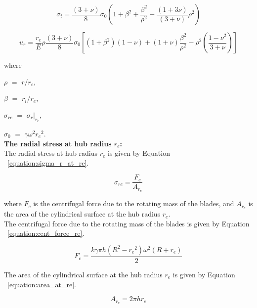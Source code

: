 \documentclass[12pt, a4paper, twoside]{article}
\begin{document}
\begin{equation}
	\label{equation:equation:r_sigma_t}
	{{\sigma }_{t}={\frac {(3+{\nu })} {8}{{\sigma }_{0}}}\left ( {1+{{\beta }^{2}}+{\frac {{\beta }^{2}} {{\rho }^{2}}-{\frac {\left ( {1+3{\nu }} \right )} {\left ( {3+{\nu }} \right )}}{\rho }^{2}}} \right )}
\end{equation}

\begin{equation}
	\label{equation:r_u_r}
	{{u}_{r}}={\frac {{r}_{e}} {E}}{{\rho }\frac {\left ( {3+{\nu }} \right )} {8}}{{\sigma }_{0}}\left [ {\left ( {1+{{\beta }^{2}}} \right )\left ( {1-{\nu }} \right )+\left ( {1+{\nu }} \right ){\frac {{\beta }^{2}} {{\rho }^{2}}}-{{\rho }^{2}}\left ( {{\frac {1-{{\nu }^{2}}} {3+{\nu }}}} \right )} \right ]
\end{equation}

where

$\rho$ $=$ $r/r_e$,

$\beta$ $=$ $r_i/r_e$,

$\sigma_{re}$ $=$ $\sigma_r|_{r_e}$, 

$\sigma_0$ $=$ $\gamma{\omega}^{2}{r_e}^{2}$.\\

\noindent
\textbf{The radial stress at hub radius $r_e$:}\\

The radial stress at hub radius $r_e$ is given by Equation  ~\ref{equation:sigma_r_at_re}.

\begin{equation}
	\label{equation:sigma_r_at_re}
	{\sigma}_{re}=\frac{F_c}{A_{r_e}}
\end{equation}

\noindent
where $F_c$ is the centrifugal force due to the rotating mass of the blades, and ${A_{r_e}}$ is the area of the cylindrical surface at the hub radius $r_e$.\\


The centrifugal force due to the rotating mass of the blades is given by Equation  ~\ref{equation:cent_force_re}.

\begin{equation}
	\label{equation:cent_force_re}
	F_c=\frac{ k \gamma \pi h (R^2-{r_e}^2) {\omega}^2 (R + r_e) }{2}
\end{equation}


The area of the cylindrical surface at the hub radius $r_e$ is given by Equation  ~\ref{equation:area_at_re}.

\begin{equation}
	\label{equation:area_at_re}
	{A_{r_e}=2 \pi h r_e}
\end{equation}
\end{document}
